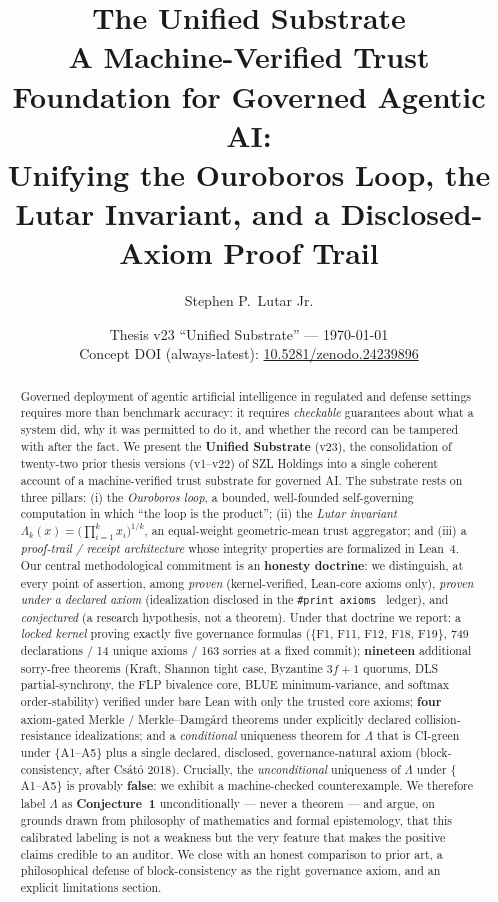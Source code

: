 \documentclass[11pt]{article}
\title{\textbf{The Unified Substrate}\\[2pt]
\large A Machine-Verified Trust Foundation for Governed Agentic AI:\\
Unifying the Ouroboros Loop, the Lutar Invariant, and a Disclosed-Axiom Proof Trail}
\author[1]{Stephen P.\ Lutar Jr.}
\affil[1]{SZL Holdings \quad ORCID: \href{https://orcid.org/0009-0001-0110-4173}{0009-0001-0110-4173}}
\date{Thesis v23 ``Unified Substrate'' --- \today\\[4pt]
\small Concept DOI (always-latest): \href{https://doi.org/10.5281/zenodo.24239896}{10.5281/zenodo.24239896}}
\theoremstyle{plain}
\theoremstyle{definition}
\theoremstyle{remark}
\newcommand{\La}{\Lambda}
\newcommand{\printax}[1]{\texttt{\#print axioms}~\texttt{#1}}
\begin{document}
\maketitle
\thispagestyle{fancy}

\begin{abstract}
\noindent
Governed deployment of agentic artificial intelligence in regulated and defense
settings requires more than benchmark accuracy: it requires \emph{checkable}
guarantees about what a system did, why it was permitted to do it, and whether the
record can be tampered with after the fact. We present the \textbf{Unified
Substrate} (v23), the consolidation of twenty-two prior thesis versions (v1--v22)
of SZL Holdings into a single coherent account of a machine-verified trust
substrate for governed AI. The substrate rests on three pillars: (i) the
\emph{Ouroboros loop}, a bounded, well-founded self-governing computation in which
``the loop is the product''; (ii) the \emph{Lutar invariant} $\La_k(x) = \big(\prod_{i=1}^k
x_i\big)^{1/k}$, an equal-weight geometric-mean trust aggregator; and (iii) a
\emph{proof-trail / receipt architecture} whose integrity properties are
formalized in Lean~4. Our central methodological commitment is an
\textbf{honesty doctrine}: we distinguish, at every point of assertion, among
\emph{proven} (kernel-verified, Lean-core axioms only), \emph{proven under a
declared axiom} (idealization disclosed in the \printax{} ledger), and
\emph{conjectured} (a research hypothesis, not a theorem). Under that doctrine we
report: a \emph{locked kernel} proving exactly five governance formulas
($\{$F1, F11, F12, F18, F19$\}$, 749 declarations / 14 unique axioms / 163 sorries
at a fixed commit); \textbf{nineteen} additional sorry-free theorems (Kraft,
Shannon tight case, Byzantine $3f{+}1$ quorums, DLS partial-synchrony, the FLP
bivalence core, BLUE minimum-variance, and softmax order-stability) verified under
bare Lean with only the trusted core axioms; \textbf{four} axiom-gated Merkle /
Merkle--Damg{\aa}rd theorems under explicitly declared collision-resistance
idealizations; and a \emph{conditional} uniqueness theorem for $\La$ that is
CI-green under $\{$A1--A5$\}$ plus a single declared, disclosed,
governance-natural axiom (block-consistency, after Cs\'at\'o 2018). Crucially, the
\emph{unconditional} uniqueness of $\La$ under $\{$A1--A5$\}$ is provably
\textbf{false}: we exhibit a machine-checked counterexample. We therefore label
$\La$ as \textbf{Conjecture~1} unconditionally --- never a theorem --- and argue,
on grounds drawn from philosophy of mathematics and formal epistemology, that this
calibrated labeling is not a weakness but the very feature that makes the positive
claims credible to an auditor. We close with an honest comparison to prior art, a
philosophical defense of block-consistency as the right governance axiom, and an
explicit limitations section.
\end{abstract}
\end{document}
